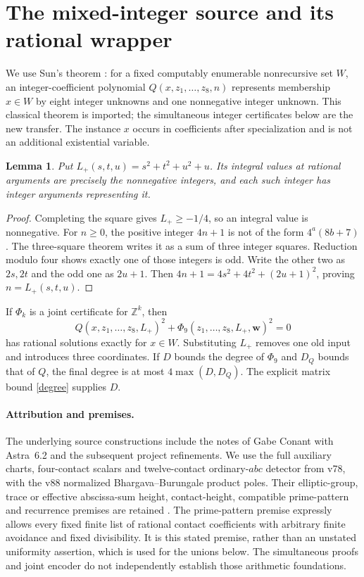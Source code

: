 \documentclass[11pt]{article}
\newtheorem{lemma}[theorem]{Lemma}
\begin{document}
\section{The mixed-integer source and its rational wrapper}
We use Sun's theorem \cite[Theorem 1.1(i)]{Sun}: for a fixed computably
enumerable nonrecursive set $W$, an integer-coefficient polynomial
$Q(x,z_1,\ldots,z_8,n)$ represents membership $x\in W$ by eight integer
unknowns and one nonnegative integer unknown. This classical theorem is
imported; the simultaneous integer certificates below are the new transfer.
The instance $x$ occurs in coefficients after specialization and is not
an additional existential variable.

\begin{lemma}\label{wrapper}
Put $L_+(s,t,u)=s^2+t^2+u^2+u$. Its integral values at rational arguments
are precisely the nonnegative integers, and each such integer has integer
arguments representing it.
\end{lemma}
\begin{proof}
Completing the square gives $L_+\ge-1/4$, so an integral value is nonnegative.
For $n\ge0$, the positive integer $4n+1$ is not of the form
$4^a(8b+7)$. The three-square theorem writes it as a sum of three integer
squares. Reduction modulo four shows exactly one of those integers is
odd. Write the other two as $2s,2t$ and the odd one as $2u+1$.
Then $4n+1=4s^2+4t^2+(2u+1)^2$, proving $n=L_+(s,t,u)$.
\end{proof}

If $\Phi_k$ is a joint certificate for $\mathbb Z^k$, then
\[
 Q(x,z_1,\ldots,z_8,L_+)^2+
 \Phi_9(z_1,\ldots,z_8,L_+,\mathbf w)^2=0
\]
has rational solutions exactly for $x\in W$. Substituting $L_+$ removes
one old input and introduces three coordinates. If $D$ bounds the degree
of $\Phi_9$ and $D_Q$ bounds that of $Q$, the final degree is at most
$4\max(D,D_Q)$. The explicit matrix bound \eqref{degree} supplies $D$.

\paragraph{Attribution and premises.}
The underlying source constructions include the notes of Gabe Conant with
Astra~6.2 and the subsequent project refinements. We use the full auxiliary
charts, four-contact scalars and twelve-contact ordinary-$abc$ detector
from v78, with the v88 normalized Bhargava--Burungale product poles.
Their elliptic-group, trace or effective abscissa-sum height, contact-height,
compatible prime-pattern and recurrence premises are retained
\cite{v19,v78,v88,BB}. The prime-pattern premise expressly
allows every fixed finite list of rational contact coefficients with
arbitrary finite avoidance and fixed divisibility. It is this stated
premise, rather than an unstated uniformity assertion, which is used for
the unions below. The simultaneous proofs and joint encoder do not
independently establish those arithmetic foundations.
\end{document}
